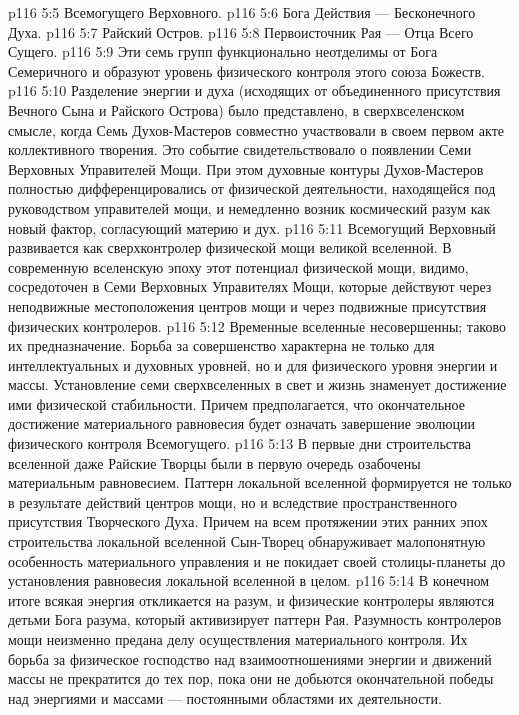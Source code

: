 \vs p116 5:5 \bibnobreakspace Всемогущего Верховного.
\vs p116 5:6 \bibnobreakspace Бога Действия --- Бесконечного Духа.
\vs p116 5:7 \bibnobreakspace Райский Остров.
\vs p116 5:8 \bibnobreakspace Первоисточник Рая --- Отца Всего Сущего.
\vs p116 5:9 Эти семь групп функционально неотделимы от Бога Семеричного и образуют уровень физического контроля этого союза Божеств.
\vs p116 5:10 \pc Разделение энергии и духа (исходящих от объединенного присутствия Вечного Сына и Райского Острова) было представлено, в сверхвселенском смысле, когда Семь Духов\hyp{}Мастеров совместно участвовали в своем первом акте коллективного творения. Это событие свидетельствовало о появлении Семи Верховных Управителей Мощи. При этом духовные контуры Духов\hyp{}Мастеров полностью дифференцировались от физической деятельности, находящейся под руководством управителей мощи, и немедленно возник космический разум как новый фактор, согласующий материю и дух.
\vs p116 5:11 Всемогущий Верховный развивается как сверхконтролер физической мощи великой вселенной. В современную вселенскую эпоху этот потенциал физической мощи, видимо, сосредоточен в Семи Верховных Управителях Мощи, которые действуют через неподвижные местоположения центров мощи и через подвижные присутствия физических контролеров.
\vs p116 5:12 \pc Временные вселенные несовершенны; таково их предназначение. Борьба за совершенство характерна не только для интеллектуальных и духовных уровней, но и для физического уровня энергии и массы. Установление семи сверхвселенных в свет и жизнь знаменует достижение ими физической стабильности. Причем предполагается, что окончательное достижение материального равновесия будет означать завершение эволюции физического контроля Всемогущего.
\vs p116 5:13 В первые дни строительства вселенной даже Райские Творцы были в первую очередь озабочены материальным равновесием. Паттерн локальной вселенной формируется не только в результате действий центров мощи, но и вследствие пространственного присутствия Творческого Духа. Причем на всем протяжении этих ранних эпох строительства локальной вселенной Сын\hyp{}Творец обнаруживает малопонятную особенность материального управления и не покидает своей столицы\hyp{}планеты до установления равновесия локальной вселенной в целом.
\vs p116 5:14 \pc В конечном итоге всякая энергия откликается на разум, и физические контролеры являются детьми Бога разума, который активизирует паттерн Рая. Разумность контролеров мощи неизменно предана делу осуществления материального контроля. Их борьба за физическое господство над взаимоотношениями энергии и движений массы не прекратится до тех пор, пока они не добьются окончательной победы над энергиями и массами --- постоянными областями их деятельности.
